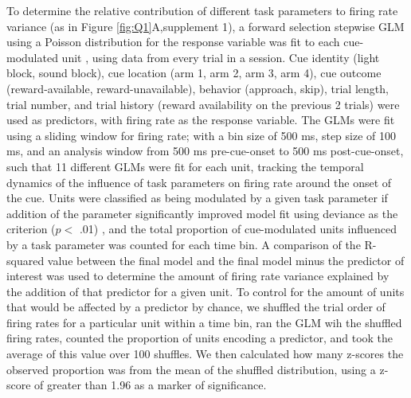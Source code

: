 \documentclass[11pt]{article}
\providecommand{\DIFadd}[1]{{\protect\color{red} \sf #1}} %
\providecommand{\DIFdel}[1]{} %
\providecommand{\DIFaddbegin}{} %
\providecommand{\DIFaddend}{} %
\providecommand{\DIFdelbegin}{} %
\providecommand{\DIFdelend}{} %
\newcommand{\DIFscaledelfig}{0.5}
\newlength{\DIFdelgraphicswidth} %
\newlength{\DIFdelgraphicsheight} %
\newcommand{\DIFaddincludegraphics}[2][]{{\color{red}\fbox{\DIFOincludegraphics[#1]{#2}}}} %
\newcommand{\DIFdelincludegraphics}[2][]{%
\sbox{\DIFdelgraphicsbox}{\DIFOincludegraphics[#1]{#2}}%
\settoboxwidth{\DIFdelgraphicswidth}{\DIFdelgraphicsbox} %
\settoboxtotalheight{\DIFdelgraphicsheight}{\DIFdelgraphicsbox} %
\scalebox{\DIFscaledelfig}{%
\parbox[b]{\DIFdelgraphicswidth}{\usebox{\DIFdelgraphicsbox}\\[-\baselineskip] \rule{\DIFdelgraphicswidth}{0em}}\llap{\resizebox{\DIFdelgraphicswidth}{\DIFdelgraphicsheight}{%
\setlength{\unitlength}{\DIFdelgraphicswidth}%
\begin{picture}(1,1)%
\thicklines\linethickness{2pt} %
{\color[rgb]{1,0,0}\put(0,0){\framebox(1,1){}}}%
{\color[rgb]{1,0,0}\put(0,0){\line( 1,1){1}}}%
{\color[rgb]{1,0,0}\put(0,1){\line(1,-1){1}}}%
\end{picture}%
}\hspace*{3pt}}} %
} %
\DeclareRobustCommand{\DIFaddbegin}{\DIFOaddbegin \let\includegraphics\DIFaddincludegraphics} %
\DeclareRobustCommand{\DIFaddend}{\DIFOaddend \let\includegraphics\DIFOincludegraphics} %
\DeclareRobustCommand{\DIFdelbegin}{\DIFOdelbegin \let\includegraphics\DIFdelincludegraphics} %
\DeclareRobustCommand{\DIFdelend}{\DIFOaddend \let\includegraphics\DIFOincludegraphics} %
\begin{document}
To determine the relative contribution of different task parameters to firing rate variance (as in \DIFdelbegin \DIFdel{Figures \ref{fig:examples}-\ref{fig:GLM}}\DIFdelend \DIFaddbegin \DIFadd{Figure \ref{fig:Q1}A,supplement 1}\DIFaddend ), a forward selection stepwise \DIFdelbegin \DIFdel{general linear model (GLM ) }\DIFdelend \DIFaddbegin \DIFadd{GLM using a Poisson distribution for the response variable }\DIFaddend was fit to each cue-modulated unit\DIFaddbegin \DIFadd{, using data from every trial in a session}\DIFaddend . Cue identity (light block, sound block), cue location (arm 1, arm 2, arm 3, arm 4), cue outcome (reward-available, reward-unavailable), behavior (approach, skip), trial length, trial number, and trial history (reward availability on the previous 2 trials) were used as predictors, \DIFdelbegin \DIFdel{and the 1 s post-cue }\DIFdelend \DIFaddbegin \DIFadd{with }\DIFaddend firing rate as the response variable. \DIFaddbegin \DIFadd{The GLMs were fit using a sliding window for firing rate; with a bin size of 500 ms, step size of 100 ms, and an analysis window from 500 ms pre-cue-onset to 500 ms post-cue-onset, such that 11 different GLMs were fit for each unit, tracking the temporal dynamics of the influence of task parameters on firing rate around the onset of the cue. }\DIFaddend Units were classified as being modulated by a given task parameter if addition of the parameter significantly improved model fit using deviance as the criterion ($p <$ .01)\DIFaddbegin \DIFadd{, and the total proportion of cue-modulated units influenced by a task parameter was counted for each time bin}\DIFaddend . A comparison of the R-squared value between the final model and the final model minus the predictor of interest was used to determine the amount of firing rate variance explained by the addition of that predictor for a given unit. To \DIFdelbegin \DIFdel{investigate more finely the temporal dynamics of }\DIFdelend \DIFaddbegin \DIFadd{control for the amount of units that would be affected by a predictor by chance, we shuffled the trial order of firing rates for a particular unit within a time bin, ran the GLM wih the shuffled firing rates, counted }\DIFaddend the \DIFdelbegin \DIFdel{influence of task parameters to unit activity, we then fit a sliding window GLM with the same task parameters using 500 ms bins and 100 ms steps, starting 500 ms before cue-onset, up to 500 ms after cue-onset, and measured the }\DIFdelend proportion of units \DIFdelbegin \DIFdel{and average R-squared value for a given time bin
where a particular predictor contributed significantly to the final model. To control for the amount of units that would be affected by a predictor by }\DIFdelend \DIFaddbegin \DIFadd{encoding a predictor, and took the average of this value over 100 shuffles. We then calculated how many z-scores the observed proportion was from the mean of the shuffled distribution, using a z-score of greater than 1.96 as a marker of significance.
}
\end{document}
